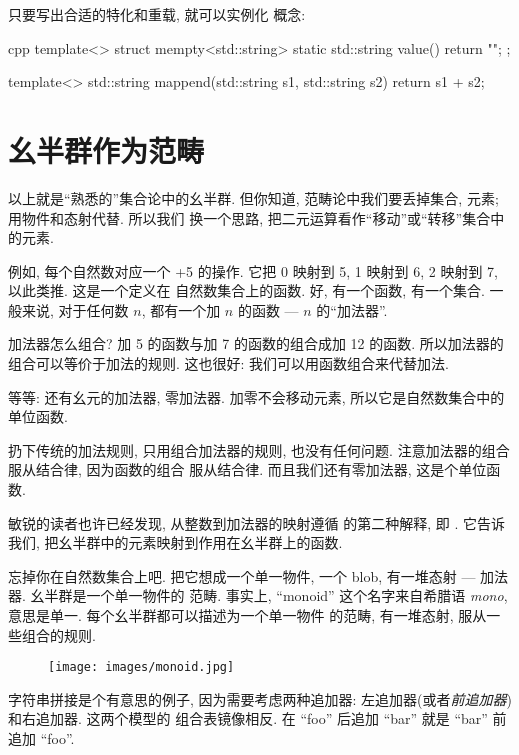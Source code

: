 只要写出合适的特化和重载, 就可以实例化  概念:

\begin{snip}{cpp}
template<>
struct mempty<std::string> {
    static std::string value() { return ""; }
};

template<>
std::string mappend(std::string s1, std::string s2) {
    return s1 + s2;
}
\end{snip}

\section{幺半群作为范畴}

以上就是``熟悉的''集合论中的幺半群. 但你知道, 范畴论中我们要丢掉集合, 元素; 用物件和态射代替. 所以我们
换一个思路, 把二元运算看作``移动''或``转移''集合中的元素.

例如, 每个自然数对应一个 +5 的操作. 它把 0 映射到 5, 1 映射到 6, 2 映射到 7, 以此类推. 这是一个定义在
自然数集合上的函数. 好, 有一个函数, 有一个集合. 一般来说, 对于任何数 $n$, 都有一个加 $n$ 的函数 ---
$n$ 的``加法器''.

加法器怎么组合? 加 5 的函数与加 7 的函数的组合成加 12 的函数. 所以加法器的组合可以等价于加法的规则.
这也很好: 我们可以用函数组合来代替加法.

等等: 还有幺元的加法器, 零加法器. 加零不会移动元素, 所以它是自然数集合中的单位函数.

扔下传统的加法规则, 只用组合加法器的规则, 也没有任何问题. 注意加法器的组合服从结合律, 因为函数的组合
服从结合律. 而且我们还有零加法器, 这是个单位函数.

敏锐的读者也许已经发现, 从整数到加法器的映射遵循  的第二种解释, 即 .
它告诉我们,  把幺半群中的元素映射到作用在幺半群上的函数.

忘掉你在自然数集合上吧. 把它想成一个单一物件, 一个 blob, 有一堆态射 --- 加法器. 幺半群是一个单一物件的
范畴. 事实上, ``monoid'' 这个名字来自希腊语 \emph{mono}, 意思是单一. 每个幺半群都可以描述为一个单一物件
的范畴, 有一堆态射, 服从一些组合的规则.


\begin{figure}[H]
  \centering
  \texttt{[image: images/monoid.jpg]}
\end{figure}

\noindent
字符串拼接是个有意思的例子, 因为需要考虑两种追加器: 左追加器(或者\emph{前追加器})和右追加器. 这两个模型的
组合表镜像相反. 在 ``foo'' 后追加 ``bar'' 就是 ``bar'' 前追加 ``foo''.

